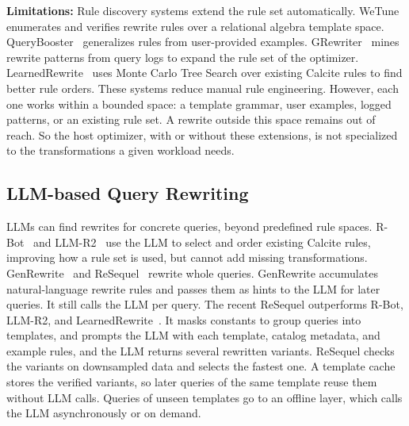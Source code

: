 \textbf{Limitations:} Rule discovery systems extend the rule set automatically.
WeTune~\cite{WeTune} enumerates and verifies rewrite rules over a relational algebra template space.
QueryBooster~\cite{QueryBooster} generalizes rules from user-provided examples.
GRewriter~\cite{GRewriter} mines rewrite patterns from query logs to expand the rule set of the optimizer.
LearnedRewrite~\cite{learnedrewrite} uses Monte Carlo Tree Search over existing Calcite rules to find better rule orders.
These systems reduce manual rule engineering.
However, each one works within a bounded space: a template grammar, user examples, logged patterns, or an existing rule set.
A rewrite outside this space remains out of reach.
So the host optimizer, with or without these extensions, is not specialized to the transformations a given workload needs.

\vspace{-0.15cm}
\subsection{LLM-based Query Rewriting}
\label{sec:bg_llm}
LLMs can find rewrites for concrete queries, beyond predefined rule spaces.
R-Bot~\cite{RBot} and LLM-R2~\cite{LLMR2} use the LLM to select and order existing Calcite rules, improving how a rule set is used, but cannot add missing transformations.
GenRewrite~\cite{GenRewrite} and ReSequel~\cite{resequel} rewrite whole queries.
GenRewrite accumulates natural-language rewrite rules and passes them as hints to the LLM for later queries.
It still calls the LLM per query.  The recent ReSequel outperforms R-Bot, LLM-R2, and LearnedRewrite~\cite{resequel}.
It masks constants to group queries into templates, and prompts the LLM with each template, catalog metadata, and example rules, and the LLM returns several rewritten variants. ReSequel checks the variants on downsampled data and selects the fastest one.
A template cache stores the verified variants, so later queries of the same template reuse them without LLM calls.
Queries of unseen templates go to an offline layer, which calls the LLM asynchronously or on demand.

